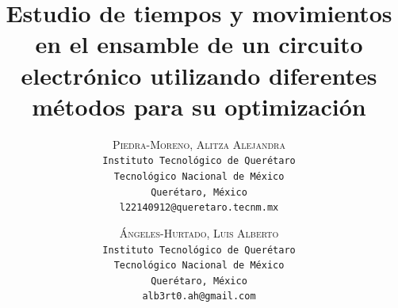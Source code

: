     \lfoot{ \thepage}
    
    \setlength{\droptitle}{-5\baselineskip} %
    \title{\textbf{Estudio de tiempos y movimientos en el ensamble de un circuito electrónico utilizando diferentes métodos para su optimización }} %
    
     \author{ 
     \textsc{Piedra-Moreno, Alitza Alejandra}\\ 
     \texttt{ Instituto Tecnológico de Querétaro } \\ 
     \texttt{ Tecnológico Nacional de México } \\ 
     \texttt{Querétaro, México}\\ 
     \texttt{l22140912@queretaro.tecnm.mx} 
     \and 
     \textsc{Ángeles-Hurtado, Luis Alberto}\\ 
     \texttt{ Instituto Tecnológico de Querétaro } \\ 
     \texttt{ Tecnológico Nacional de México } \\ 
     \texttt{Querétaro, México}\\ 
     \texttt{alb3rt0.ah@gmail.com} 
    }
    
    
    
    
